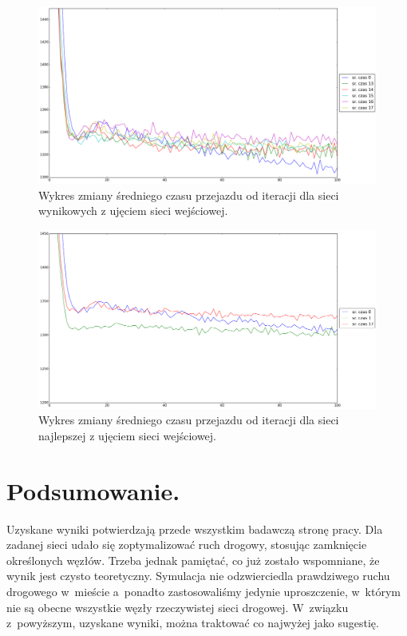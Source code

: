 \documentclass[twoside,12pt]{report}
\let\oldsection\chapter
\def\chapter{\cleardoublepage\oldsection}
\begin{document}
\begin{figure}[ht]
\centering
\includegraphics[width=1\textwidth]{img/iters/iters4}
\caption{Wykres zmiany średniego czasu przejazdu od iteracji dla sieci wynikowych z ujęciem sieci wejściowej.}
\label{iters4}
\end{figure}

\begin{figure}[ht]
\centering
\includegraphics[width=1\textwidth]{img/iters/iters5}
\caption{Wykres zmiany średniego czasu przejazdu od iteracji dla sieci najlepszej z ujęciem sieci wejściowej.}
\label{iters5}
\end{figure}

\chapter{Podsumowanie.}\label{rozdz.podsumowanie} 
Uzyskane wyniki potwierdzają przede wszystkim badawczą stronę pracy. Dla zadanej sieci udało się zoptymalizować ruch drogowy, stosując zamknięcie określonych węzłów. Trzeba jednak pamiętać, co już zostało wspomniane, że wynik jest czysto teoretyczny. Symulacja nie odzwierciedla prawdziwego ruchu drogowego w~mieście a~ponadto zastosowaliśmy jedynie uproszczenie, w~którym nie są obecne wszystkie węzły rzeczywistej sieci drogowej. W~związku z~powyższym, uzyskane wyniki, można traktować co najwyżej jako sugestię. 
\end{document}
